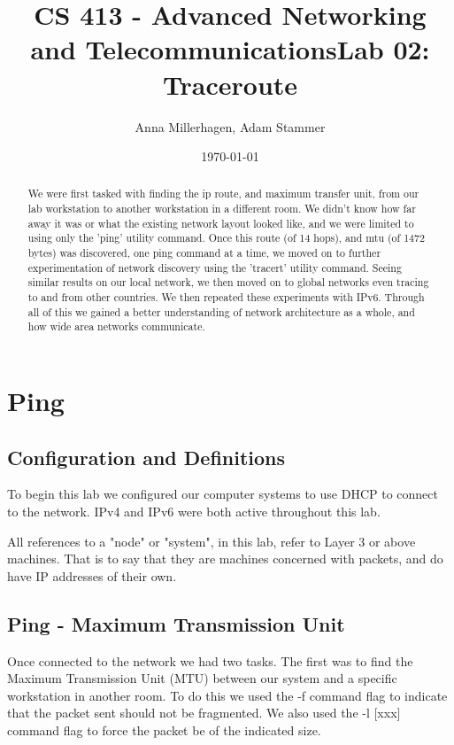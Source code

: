 \documentclass[prb,preprint]{revtex4-1}
\begin{document}
\title{CS 413 - Advanced Networking and Telecommunications\newline Lab 02: Traceroute}
\author{Anna Millerhagen, Adam Stammer}

\date{\today}

\begin{abstract}
We were first tasked with finding the ip route, and maximum transfer unit, from our lab workstation to another workstation in a different room. We didn't know how far away it was or what the existing network layout looked like, and we were limited to using only the 'ping' utility command. Once this route (of 14 hops), and mtu (of 1472 bytes) was discovered, one ping command at a time, we moved on to further experimentation of network discovery using the 'tracert' utility command. Seeing similar results on our local network, we then moved on to global networks even tracing to and from other countries. We then repeated these experiments with IPv6. Through all of this we gained a better understanding of network architecture as a whole, and how wide area networks communicate.
\end{abstract}

\maketitle




\section{Ping}
\subsection{Configuration and Definitions}
To begin this lab we configured our computer systems to use DHCP to connect to the network. IPv4 and IPv6 were both active throughout this lab.

All references to a "node" or "system", in this lab, refer to Layer 3 or above machines. That is to say that they are machines concerned with packets, and do have IP addresses of their own.

\subsection{Ping - Maximum Transmission Unit}
Once connected to the network we had two tasks. The first was to find the Maximum Transmission Unit (MTU) between our system and a specific workstation in another room. To do this we used the -f command flag to indicate that the packet sent should not be fragmented. We also used the -l [xxx] command flag to force the packet be of the indicated size.
\end{document}
